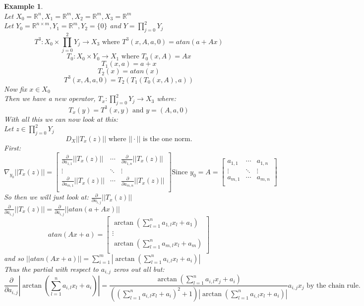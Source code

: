 \documentclass[12pt]{extarticle}
\theoremstyle{plain}
\theoremstyle{Definition}
\theoremstyle{Definition}
\theoremstyle{plain}
\newtheorem{exmp}{Example}[section]
\begin{document}
\begin{exmp} \textbf{} \\
Let $X_0 = \mathbb{R}^n, X_1 = \mathbb{R}^m, X_2 = \mathbb{R}^m, X_3 = \mathbb{R}^m$ \\
Let $Y_0 = \mathbb{R}^{n\times m}, Y_1 = \mathbb{R}^m, Y_2 = \{0\}$ and $Y = \prod_{j=0}^{2} Y_j$ 
$$T^3 : X_0 \times \prod_{j=0}^{2} Y_j \to X_3  \text{ where } T^3(x,A,a,0) = atan(a + Ax)$$ 
$$T_0 : X_0 \times Y_0 \to X_1 \text{ where } T_0(x,A) = Ax$$ 
$$T_1(x,a) = a+x$$ 
$$T_2(x) = atan(x)$$ 
$$T^3(x,A,a,0) = T_2(T_1(T_0(x,A),a) )$$ 
Now fix $x \in X_0$ \\ 
Then we have a new operator, $T_x : \prod_{j=0}^{2} Y_j \to X_3$ where: \\ 
$$T_x(y) = T^3(x,y) \text{ and } y = (A,a,0)$$
With all this we can now look at this: \\ 
Let $z \in \prod_{j=0}^{2} Y_j$ 
$$D_X ||T_x(z)|| \text{ where } ||\cdot|| \text{ is the one norm.}$$
First: \\ 
\[
\nabla_{y_0} ||T_x(z)|| = 
\begin{bmatrix}
\frac{\partial}{\partial a_{1,1}} ||T_x(z)|| & \cdots & \frac{\partial}{\partial a_{1,n}} ||T_x(z)|| \\
\vdots & \ddots & \vdots \\ 
\frac{\partial}{\partial a_{m,1}} ||T_x(z)|| & \cdots & \frac{\partial}{\partial a_{m,n}} ||T_x(z)|| \\
\end{bmatrix}
\text{Since } y_0 = A = 
\begin{bmatrix}
a_{1,1} & \cdots & a_{1,n} \\ 
\vdots & \ddots & \vdots \\ 
a_{m,1} & \cdots & a_{m,n} \\ 
\end{bmatrix}
\]
So then we will just look at: $\frac{\partial}{\partial a_{i,j}} ||T_x(z)||$ \\ 
$\frac{\partial}{\partial a_{i,j}} ||T_x(z)|| = \frac{\partial}{\partial a_{i,j}} ||atan(a + Ax)||$ \\
\[
atan(Ax +a) = 
\begin{bmatrix}
\arctan(\sum_{l=1}^n a_{1,l}x_l + a_1)\\ 
\vdots \\ 
\arctan(\sum_{l=1}^n a_{m,l}x_l + a_m)\\ 
\end{bmatrix}
\]
and so $||atan(Ax +a)|| = \sum_{i=1}^m | \arctan(\sum_{l=1}^n a_{i,l}x_l + a_i)|$ \\
Thus the partial with respect to $a_{i,j}$ zeros out all but: \\
$$\frac{\partial}{\partial a_{i,j}}| \arctan(\sum_{l=1}^n a_{i,l}x_l + a_i)| = \frac{\arctan(\sum_{l=1}^n a_{i,l}x_j + a_i)}{((\sum_{l=1}^n a_{i,l}x_l + a_i)^2 + 1  )|\arctan(\sum_{l=1}^n a_{i,l}x_l + a_i)|}a_{i,j}x_j \text{ by the chain rule. }$$
\end{exmp}
\end{document}
